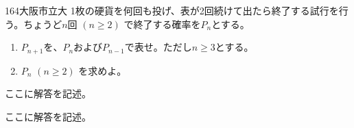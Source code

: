 \begin{thm}{164}{}{大阪市立大}
 1枚の硬貨を何回も投げ、表が2回続けて出たら終了する試行を行う。ちょうど$n$回 $(n\ge 2)$ で終了する確率を$P_n$とする。
 \begin{enumerate}
  \item $P_{n+1}$を、$P_n$および$P_{n-1}$で表せ。ただし$n\ge 3$とする。
  \item $P_n$ $(n\ge 2)$ を求めよ。
 \end{enumerate}
\end{thm}

ここに解答を記述。

ここに解答を記述。